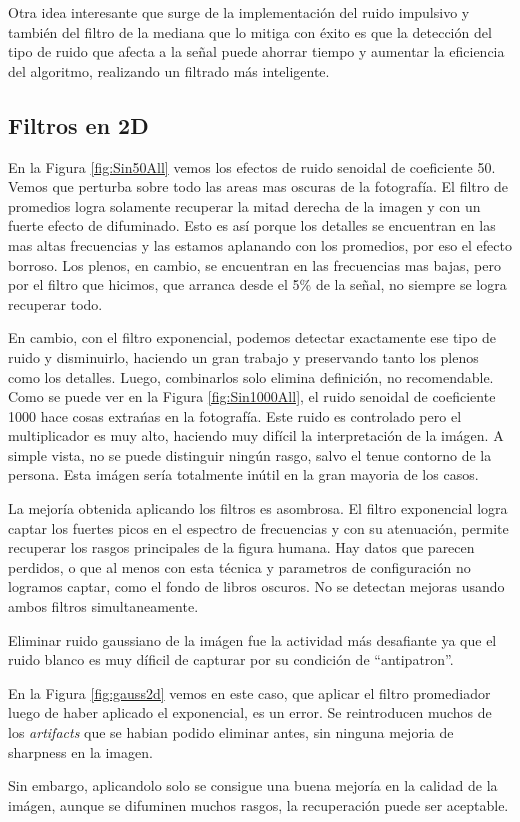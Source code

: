 Otra idea interesante que surge de la implementaci\'on del ruido impulsivo y tambi\'en del
filtro de la mediana que lo mitiga con \'exito es que la detecci\'on del tipo de ruido que afecta
a la se\~nal puede ahorrar tiempo y aumentar la eficiencia del algoritmo, realizando un filtrado m\'as
inteligente.

\subsection{Filtros en 2D}


En la Figura \ref{fig:Sin50All} vemos los efectos de ruido senoidal
de coeficiente 50. Vemos que perturba sobre todo las areas mas oscuras
de la fotograf\'ia. El filtro de promedios logra solamente recuperar la mitad
derecha de la imagen y con un fuerte efecto de difuminado.
Esto es as\'i porque los detalles se encuentran en las mas altas frecuencias
y las estamos aplanando con los promedios, por eso el efecto borroso.
Los plenos, en cambio, se encuentran en las frecuencias mas bajas, pero
por el filtro que hicimos, que arranca desde el 5\% de la señal,
no siempre se logra recuperar todo.

En cambio, con el filtro exponencial, podemos detectar exactamente ese
tipo de ruido y disminuirlo, haciendo un gran trabajo y preservando tanto
los plenos como los detalles. Luego, combinarlos solo elimina definici\'on,
no recomendable.\\


Como se puede ver en la Figura \ref{fig:Sin1000All}, el ruido senoidal
de coeficiente 1000 hace cosas extra\'nas en la fotograf\'ia.
Este ruido es controlado pero el multiplicador es muy alto, haciendo muy 
dif\'icil la interpretaci\'on de la im\'agen. A simple vista, no se puede distinguir ning\'un rasgo,
salvo el tenue contorno de la persona.
Esta im\'agen ser\'ia totalmente in\'util en la gran mayoria de los casos.

La mejor\'ia obtenida aplicando los filtros es asombrosa.
El filtro exponencial logra captar los fuertes picos en el espectro de
frecuencias y con su atenuaci\'on, permite recuperar los rasgos principales
de la figura humana.
Hay datos que parecen perdidos, o que al menos con esta t\'ecnica y
parametros de configuraci\'on no logramos captar, como el fondo de
libros oscuros. No se detectan mejoras usando ambos filtros simultaneamente.

Eliminar ruido gaussiano de la im\'agen fue la actividad m\'as desafiante
ya que el ruido blanco es muy d\'ificil de capturar por su condici\'on de ``antipatron''.

En la Figura \ref{fig:gauss2d} vemos en este caso, que aplicar el filtro
promediador luego de haber aplicado el exponencial, es un error. 
Se reintroducen muchos de los \textit{artifacts} que se habian podido
eliminar antes, sin ninguna mejoria de sharpness en la imagen. 

Sin embargo, aplicandolo solo se consigue una buena mejor\'ia en la calidad
de la im\'agen, aunque se difuminen muchos rasgos, la recuperaci\'on puede ser aceptable.
